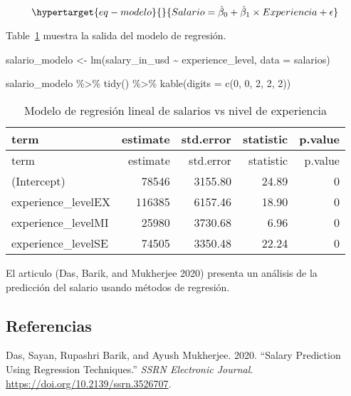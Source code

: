 \documentclass[
  letterpaper,
  DIV=11,
  numbers=noendperiod]{scrartcl}
\newenvironment{Shaded}{\begin{snugshade}}{\end{snugshade}}
\newcommand{\AttributeTok}[1]{\textcolor[rgb]{0.40,0.45,0.13}{#1}}
\newcommand{\DecValTok}[1]{\textcolor[rgb]{0.68,0.00,0.00}{#1}}
\newcommand{\FunctionTok}[1]{\textcolor[rgb]{0.28,0.35,0.67}{#1}}
\newcommand{\NormalTok}[1]{\textcolor[rgb]{0.00,0.23,0.31}{#1}}
\newcommand{\OtherTok}[1]{\textcolor[rgb]{0.00,0.23,0.31}{#1}}
\newcommand{\SpecialCharTok}[1]{\textcolor[rgb]{0.37,0.37,0.37}{#1}}
\newlength{\cslhangindent}
\newlength{\cslentryspacingunit} %
\newenvironment{CSLReferences}[2] %
 {%
  \setlength{\parindent}{0pt}
  \ifodd #1
  \let\oldpar\par
  \def\par{\hangindent=\cslhangindent\oldpar}
  \fi
  \setlength{\parskip}{#2\cslentryspacingunit}
 }%
 {}
\begin{document}
\begin{equation}\protect\hypertarget{eq-modelo}{}{
Salario = \hat{\beta}_0 + \hat{\beta}_1 \times Experiencia + \epsilon
}\label{eq-modelo}\end{equation}

Table~\ref{tbl-lm} muestra la salida del modelo de regresión.

\begin{Shaded}
\begin{Highlighting}[]
\NormalTok{salario\_modelo }\OtherTok{\textless{}{-}} \FunctionTok{lm}\NormalTok{(salary\_in\_usd }\SpecialCharTok{\textasciitilde{}}\NormalTok{ experience\_level, }\AttributeTok{data =}\NormalTok{ salarios)}

\NormalTok{salario\_modelo }\SpecialCharTok{\%\textgreater{}\%}
  \FunctionTok{tidy}\NormalTok{() }\SpecialCharTok{\%\textgreater{}\%}
  \FunctionTok{kable}\NormalTok{(}\AttributeTok{digits =} \FunctionTok{c}\NormalTok{(}\DecValTok{0}\NormalTok{, }\DecValTok{0}\NormalTok{, }\DecValTok{2}\NormalTok{, }\DecValTok{2}\NormalTok{, }\DecValTok{2}\NormalTok{))}
\end{Highlighting}
\end{Shaded}

\hypertarget{tbl-lm}{}
\begin{longtable}[]{@{}lrrrr@{}}
\caption{\label{tbl-lm}Modelo de regresión lineal de salarios vs nivel
de experiencia}\tabularnewline
\toprule()
term & estimate & std.error & statistic & p.value \\
\midrule()
\endfirsthead
\toprule()
term & estimate & std.error & statistic & p.value \\
\midrule()
\endhead
(Intercept) & 78546 & 3155.80 & 24.89 & 0 \\
experience\_levelEX & 116385 & 6157.46 & 18.90 & 0 \\
experience\_levelMI & 25980 & 3730.68 & 6.96 & 0 \\
experience\_levelSE & 74505 & 3350.48 & 22.24 & 0 \\
\bottomrule()
\end{longtable}

El articulo (Das, Barik, and Mukherjee 2020) presenta un análisis de la
predicción del salario usando métodos de regresión.

\hypertarget{referencias}{%
\subsection*{Referencias}\label{referencias}}

\hypertarget{refs}{}
\begin{CSLReferences}{1}{0}
\leavevmode{}%
Das, Sayan, Rupashri Barik, and Ayush Mukherjee. 2020. {``Salary
Prediction Using Regression Techniques.''} \emph{SSRN Electronic
Journal}. \url{https://doi.org/10.2139/ssrn.3526707}.

\end{CSLReferences}
\end{document}
